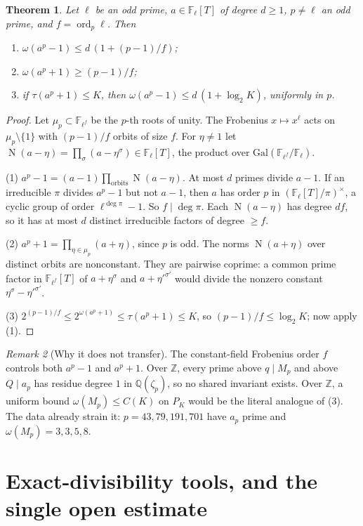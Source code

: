 \documentclass[11pt]{amsart}
\newtheorem{theorem}{Theorem}[section]
\theoremstyle{definition}
\theoremstyle{remark}
\newtheorem{remark}[theorem]{Remark}
\newcommand{\ord}{\operatorname{ord}}
\newcommand{\Z}{\mathbb{Z}}
\newcommand{\Q}{\mathbb{Q}}
\newcommand{\F}{\mathbb{F}}
\DeclareMathOperator{\Nm}{N}
\begin{document}
\begin{theorem}\label{thm:ff}
Let $\ell$ be an odd prime, $a\in\F_\ell[T]$ of degree $d\ge1$, $p\ne\ell$ an odd prime, and $f=\ord_p\ell$. Then
\begin{enumerate}
\item $\omega(a^p-1)\le d\,(1+(p-1)/f)$;
\item $\omega(a^p+1)\ge(p-1)/f$;
\item if $\tau(a^p+1)\le K$, then $\omega(a^p-1)\le d\,(1+\log_2K)$, uniformly in $p$.
\end{enumerate}
\end{theorem}
\begin{proof}
Let $\mu_p\subset\F_{\ell^f}$ be the $p$-th roots of unity. The Frobenius $x\mapsto x^\ell$ acts on
$\mu_p\setminus\{1\}$ with $(p-1)/f$ orbits of size $f$. For $\eta\ne1$ let
$\Nm(a-\eta)=\prod_{\sigma}(a-\eta^\sigma)\in\F_\ell[T]$, the product over $\mathrm{Gal}(\F_{\ell^f}/\F_\ell)$.

(1) $a^p-1=(a-1)\prod_{\text{orbits}}\Nm(a-\eta)$. At most $d$ primes divide $a-1$. If an irreducible $\pi$ divides
$a^p-1$ but not $a-1$, then $a$ has order $p$ in $(\F_\ell[T]/\pi)^\times$, a cyclic group of order
$\ell^{\deg\pi}-1$. So $f\mid\deg\pi$. Each $\Nm(a-\eta)$ has degree $df$, so it has at most $d$ distinct
irreducible factors of degree $\ge f$.

(2) $a^p+1=\prod_{\eta\in\mu_p}(a+\eta)$, since $p$ is odd. The norms $\Nm(a+\eta)$ over distinct orbits are nonconstant.
They are pairwise coprime: a common prime factor in $\F_{\ell^f}[T]$ of $a+\eta^\sigma$ and $a+\eta'^{\sigma'}$ would
divide the nonzero constant $\eta^\sigma-\eta'^{\sigma'}$.

(3) $2^{(p-1)/f}\le2^{\omega(a^p+1)}\le\tau(a^p+1)\le K$, so $(p-1)/f\le\log_2K$; now apply (1).
\end{proof}

\begin{remark}[Why it does not transfer]
The constant-field Frobenius order $f$ controls both $a^p-1$ and $a^p+1$. Over $\Z$, every prime above $q\mid M_p$ and
above $Q\mid a_p$ has residue degree $1$ in $\Q(\zeta_p)$, so no shared invariant exists. Over $\Z$, a uniform bound
$\omega(M_p)\le C(K)$ on $P_K$ would be the literal analogue of (3). The data already strain it: $p=43,79,191,701$ have
$a_p$ prime and $\omega(M_p)=3,3,5,8$.
\end{remark}

\section{Exact-divisibility tools, and the single open estimate}\label{sec:tools}
\end{document}
